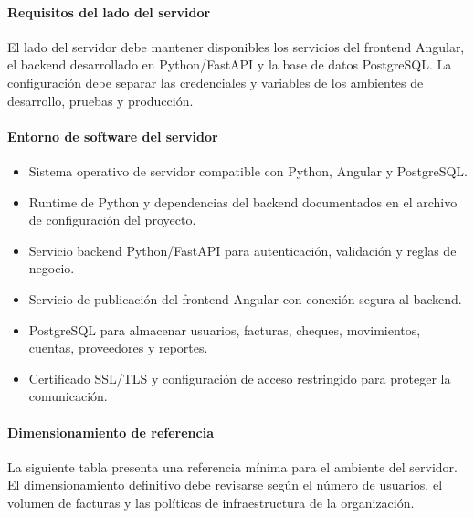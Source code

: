 \paragraph{Requisitos del lado del servidor}
El lado del servidor debe mantener disponibles los servicios del frontend Angular, el backend desarrollado en Python/FastAPI y la base de datos PostgreSQL. La configuración debe separar las credenciales y variables de los ambientes de desarrollo, pruebas y producción.

\paragraph{Entorno de software del servidor}
\begin{itemize}
\item Sistema operativo de servidor compatible con Python, Angular y PostgreSQL.
\item Runtime de Python y dependencias del backend documentados en el archivo de configuración del proyecto.
\item Servicio backend Python/FastAPI para autenticación, validación y reglas de negocio.
\item Servicio de publicación del frontend Angular con conexión segura al backend.
\item PostgreSQL para almacenar usuarios, facturas, cheques, movimientos, cuentas, proveedores y reportes.
\item Certificado SSL/TLS y configuración de acceso restringido para proteger la comunicación.
\end{itemize}

\paragraph{Dimensionamiento de referencia}
La siguiente tabla presenta una referencia mínima para el ambiente del servidor. El dimensionamiento definitivo debe revisarse según el número de usuarios, el volumen de facturas y las políticas de infraestructura de la organización.

